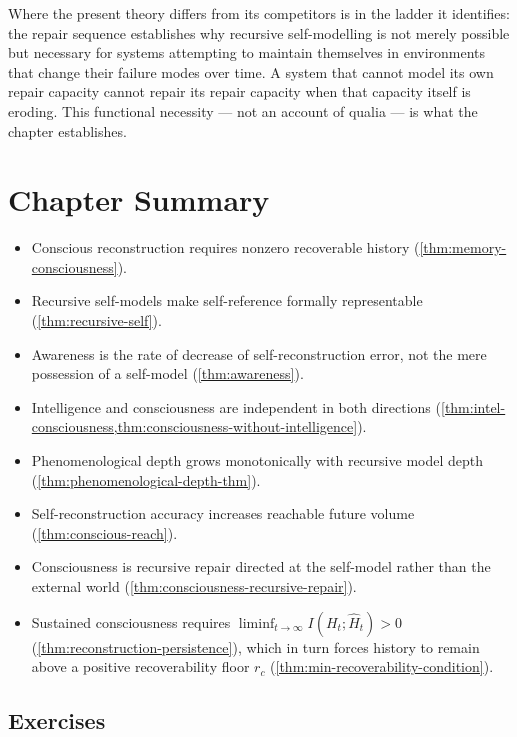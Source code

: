 \documentclass[12pt,twoside,openright]{book}
\newenvironment{chapsummary}{%
  \begin{tcolorbox}[colback=DistBlue!5,colframe=DistBlue,
    title={\faBookOpen\enspace Summary},
    fonttitle=\sffamily\bfseries\color{white},
    attach boxed title to top left={yshift=-2mm,xshift=4mm},
    boxed title style={colback=DistBlue,rounded corners}]
  \begin{itemize}[nosep,leftmargin=*]}{%
  \end{itemize}\end{tcolorbox}}
\begin{document}
Where the present theory differs from its competitors is in
the ladder it identifies: the repair sequence establishes
why recursive self-modelling is not merely possible but
necessary for systems attempting to maintain themselves in
environments that change their failure modes over time. A
system that cannot model its own repair capacity cannot
repair its repair capacity when that capacity itself is
eroding. This functional necessity --- not an account of
qualia --- is what the chapter establishes.

\section*{Chapter Summary}
\begin{chapsummary}
  \item Conscious reconstruction requires nonzero
        recoverable history (\cref{thm:memory-consciousness}).
  \item Recursive self-models make self-reference formally
        representable (\cref{thm:recursive-self}).
  \item Awareness is the rate of decrease of
        self-reconstruction error, not the mere possession
        of a self-model (\cref{thm:awareness}).
  \item Intelligence and consciousness are independent in
        both directions
        (\cref{thm:intel-consciousness,thm:consciousness-without-intelligence}).
  \item Phenomenological depth grows monotonically with
        recursive model depth (\cref{thm:phenomenological-depth-thm}).
  \item Self-reconstruction accuracy increases reachable
        future volume (\cref{thm:conscious-reach}).
  \item Consciousness is recursive repair directed at the
        self-model rather than the external world
        (\cref{thm:consciousness-recursive-repair}).
  \item Sustained consciousness requires
        $\liminf_{t\to\infty} I(H_t;\hat H_t) > 0$
        (\cref{thm:reconstruction-persistence}), which in
        turn forces history to remain above a positive
        recoverability floor $r_c$
        (\cref{thm:min-recoverability-condition}).
\end{chapsummary}

\subsection*{Exercises}
\end{document}
